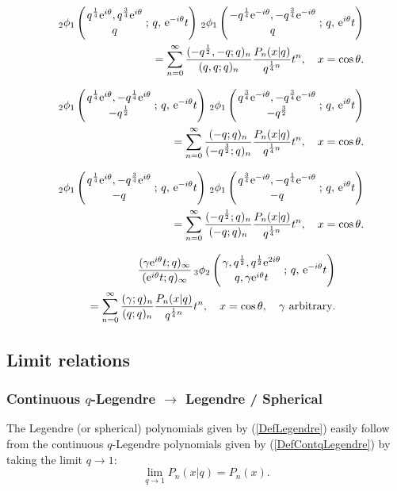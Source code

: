 \documentclass[envcountchap,graybox]{svmono}
\newcounter{rom}
\newcommand{\qhyp}[5]{\mbox{}_{#1}{\phi}_{#2}
\left(\genfrac{}{}{0pt}{}{#3}{#4}\,;\,q,\,#5\right)}
\newcommand{\e}{\textrm{e}}
\begin{document}
\begin{eqnarray}
\label{GenContqLegendre4}
& &\qhyp{2}{1}{q^{\frac{1}{4}}\e^{i\theta},q^{\frac{3}{4}}\e^{i\theta}}{q}{\e^{-i\theta}t}\,
\qhyp{2}{1}{-q^{\frac{1}{4}}\e^{-i\theta},-q^{\frac{3}{4}}\e^{-i\theta}}{q}{\e^{i\theta}t}\nonumber\\
& &{}=\sum_{n=0}^{\infty}\frac{(-q^{\frac{1}{2}},-q;q)_n}{(q,q;q)_n}
\frac{P_n(x|q)}{q^{\frac{1}{4}n}}t^n,\quad x=\cos\theta.
\end{eqnarray}

\begin{eqnarray}
\label{GenContqLegendre5}
& &\qhyp{2}{1}{q^{\frac{1}{4}}\e^{i\theta},-q^{\frac{1}{4}}\e^{i\theta}}{-q^{\frac{1}{2}}}{\e^{-i\theta}t}\,
\qhyp{2}{1}{q^{\frac{3}{4}}\e^{-i\theta},-q^{\frac{3}{4}}\e^{-i\theta}}{-q^{\frac{3}{2}}}{\e^{i\theta}t}\nonumber\\
& &{}=\sum_{n=0}^{\infty}\frac{(-q;q)_n}{(-q^{\frac{3}{2}};q)_n}
\frac{P_n(x|q)}{q^{\frac{1}{4}n}}t^n,\quad x=\cos\theta.
\end{eqnarray}

\begin{eqnarray}
\label{GenContqLegendre6}
& &\qhyp{2}{1}{q^{\frac{1}{4}}\e^{i\theta},-q^{\frac{3}{4}}\e^{i\theta}}{-q}{\e^{-i\theta}t}\,
\qhyp{2}{1}{q^{\frac{3}{4}}\e^{-i\theta},-q^{\frac{1}{4}}\e^{-i\theta}}{-q}{\e^{i\theta}t}\nonumber\\
& &{}=\sum_{n=0}^{\infty}\frac{(-q^{\frac{1}{2}};q)_n}{(-q;q)_n}
\frac{P_n(x|q)}{q^{\frac{1}{4}n}}t^n,\quad x=\cos\theta.
\end{eqnarray}

\begin{eqnarray}
\label{GenContqLegendre7}
& &\frac{(\gamma\e^{i\theta}t;q)_{\infty}}{(\e^{i\theta}t;q)_{\infty}}\,
\qhyp{3}{2}{\gamma,q^{\frac{1}{2}},q^{\frac{1}{2}}\e^{2i\theta}}{q,\gamma\e^{i\theta}t}{\e^{-i\theta}t}\nonumber\\
& &{}=\sum_{n=0}^{\infty}\frac{(\gamma;q)_n}{(q;q)_n}\frac{P_n(x|q)}{q^{\frac{1}{4}n}}t^n,
\quad x=\cos\theta,\quad\textrm{$\gamma$ arbitrary}.
\end{eqnarray}

\subsection*{Limit relations}

\subsubsection*{Continuous $q$-Legendre $\rightarrow$ Legendre / Spherical}
The Legendre (or spherical) polynomials given by (\ref{DefLegendre}) easily
follow from the continuous $q$-Legendre polynomials given by
(\ref{DefContqLegendre}) by taking the limit $q\rightarrow 1$:
\begin{equation}
\lim_{q\rightarrow 1}P_n(x|q)=P_n(x).
\end{equation}
\end{document}
